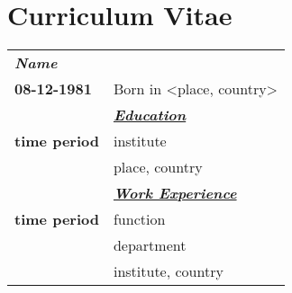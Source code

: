 \chapter[Curriculum Vitae]{Curriculum Vitae}
\label{cv}

\pagestyle{default}


\normalsize

\begin{table}[h!]
\centering
\addtolength{\tabcolsep}{1pt}
\begin{tabular}{p{2.05cm} p{13cm}}
\multicolumn{2}{l}{\textbf{\textit{Name}}}\\[12pt]
\textbf{08-12-1981} & Born in <place, country>\\[12pt]
&\underline{\textit{\textbf{Education}}}\\[4pt]
\textbf{time period} & institute\\
& place, country\\[2pt]
&\underline{\textit{\textbf{Work Experience}}}\\[4pt]
\textbf{time period} & function\\
& department\\
& institute, country\\[2pt]
\end{tabular}
\end{table}

\cleardoublepage
